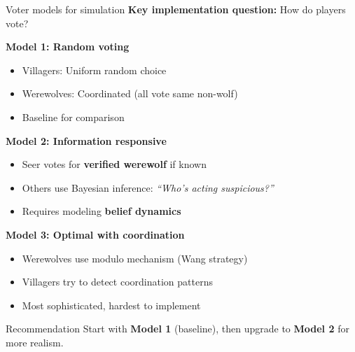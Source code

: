 \documentclass[10pt]{beamer}
\begin{document}
\begin{frame}{Voter models for simulation}
  \textbf{Key implementation question:} How do players vote?

  \vspace{0.3cm}
  \textbf{Model 1: Random voting}
  \begin{itemize}
    \item Villagers: Uniform random choice
    \item Werewolves: Coordinated (all vote same non-wolf)
    \item Baseline for comparison
  \end{itemize}

  \vspace{0.3cm}
  \textbf{Model 2: Information responsive}
  \begin{itemize}
    \item Seer votes for \textbf{verified werewolf} if known
    \item Others use Bayesian inference: \textit{``Who's acting suspicious?''}
    \item Requires modeling \textbf{belief dynamics}
  \end{itemize}

  \vspace{0.3cm}
  \textbf{Model 3: Optimal with coordination}
  \begin{itemize}
    \item Werewolves use modulo mechanism (Wang strategy)
    \item Villagers try to detect coordination patterns
    \item Most sophisticated, hardest to implement
  \end{itemize}

  \begin{alertblock}{Recommendation}
    Start with \textbf{Model 1} (baseline), then upgrade to \textbf{Model 2} for more realism.
  \end{alertblock}
\end{frame}
\end{document}
